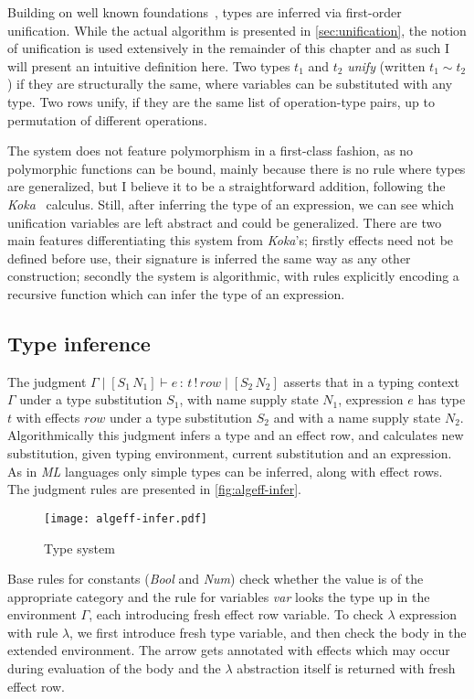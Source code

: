 \documentclass[inz, english, longabstract]{iithesis}
\begin{document}
Building on well known foundations~\cite{Pierce2002}, types are inferred via first-order unification.
While the actual algorithm is presented in \autoref{sec:unification}, the notion of unification is used extensively in the remainder of this chapter and as such I will present an intuitive definition here.
Two types $t_1$ and $t_2$ \emph{unify} (written $t_1 \sim t_2$) if they are structurally the same, where variables can be substituted with any type.
Two rows unify, if they are the same list of operation-type pairs, up to permutation of different operations.

The system does not feature polymorphism in a first-class fashion, as no polymorphic functions can be bound, mainly because there is no rule where types are generalized, but I believe it to be a straightforward addition, following the \emph{Koka}~\cite{Leijen2014} calculus.
Still, after inferring the type of an expression, we can see which unification variables are left abstract and could be generalized.
There are two main features differentiating this system from \emph{Koka}'s; firstly effects need not be defined before use, their signature is inferred the same way as any other construction; secondly the system is algorithmic, with rules explicitly encoding a recursive function which can infer the type of an expression.

\subsection{Type inference}
The judgment $ \Gamma \mid [S_1 \, N_1] \vdash e \, : \, t \, ! \, row \mid [S_2 \, N_2] $ asserts that in a typing context $ \Gamma $ under a type substitution $ S_1 $, with name supply state $ N_1 $, expression $ e $ has type $ t $ with effects $ row $ under a type substitution $ S_2 $ and with a name supply state $ N_2 $.
Algorithmically this judgment infers a type and an effect row, and calculates new substitution, given typing environment, current substitution and an expression.
As in \emph{ML} languages only simple types can be inferred, along with effect rows.
The judgment rules are presented in \autoref{fig:algeff-infer}.

\begin{figure}
  \centering
  \texttt{[image: algeff-infer.pdf]}
  \caption{Type system} 
  \label{fig:algeff-infer} 
\end{figure}

Base rules for constants (\emph{Bool} and \emph{Num}) check whether the value is of the appropriate category and the rule for variables \emph{var} looks the type up in the environment $\Gamma$, each introducing fresh effect row variable.
To check $ \lambda $ expression with rule $\lambda$, we first introduce fresh type variable, and then check the body in the extended environment.
The arrow gets annotated with effects which may occur during evaluation of the body and the $ \lambda $ abstraction itself is returned with fresh effect row.
\end{document}
